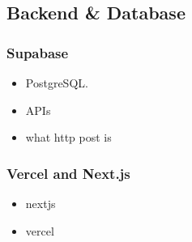 \subsection{Backend \& Database}
\subsubsection{Supabase}
\begin{itemize}  
	\item PostgreSQL. 
	\item APIs
	\item what http post is
\end{itemize}  

\subsubsection{Vercel and Next.js}
\begin{itemize}  
	\item nextjs 
	\item vercel
\end{itemize} 